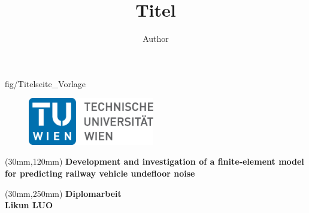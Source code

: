\author{Author}
\title{Titel}
				
\thispagestyle{empty}							

\TileWallPaper {\paperwidth }{\paperheight } {fig/Titelseite_Vorlage}	%

\begin{flushleft}

	\begin{figure}[htbp]
		\begin{minipage}[b]{.5\linewidth}
			\begin{flushleft}
				\hspace{5mm}
				\includegraphics[width=5.5cm]{fig/TU_Logo}		
			\end{flushleft}
		\end{minipage}
	\end{figure}


 \begin{spacing}{2.5}
     	\begin{textblock*}{14cm}(30mm,120mm)
        \textbf{\Huge Development and investigation of a finite-element model for predicting railway vehicle undefloor noise}
	\end{textblock*}
 \end{spacing}

	
	\begin{textblock*}{14cm}(30mm,250mm)
		\textbf{\large Diplomarbeit} \\[3mm]
		\textbf{\huge Likun LUO}
	\end{textblock*}

\end{flushleft}
